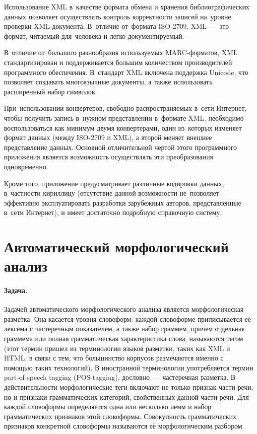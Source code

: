 \documentclass[12pt]{article}
\theoremstyle{definition}
\theoremstyle{remark}
\numberwithin{equation}{section}
\begin{document}
Использование XML в~качестве формата обмена и хранения библиографических
данных позволяет осуществлять контроль корректности записей
на~уровне проверки XML-документа. В~отличие от~формата ISO-2709,
XML~--- это формат, читаемый для~человека и легко документируемый.

В~отличие от~большого разнообразия используемых MARC-форматов, XML
стандартизирован и поддерживается большим количеством производителей
программного обеспечения. В~стандарт XML включена поддержка Unicode,
что позволяет создавать многоязычные документы, а также использовать
расширенный набор символов.

При~использовании конвертеров, свободно распространяемых в~сети
Интернет, чтобы получить запись в~нужном представлении в~формате XML,
необходимо воспользоваться как минимум двумя конвертерами, один из~которых
изменяет формат данных (между ISO-2709 и XML), а второй меняет внешнее
представление данных. Основной отличительной чертой этого программного
приложения является возможность осуществлять эти преобразования одновременно.

Кроме того, приложение предусматривает различные кодировки данных,
в~частности кириллицу (отсутствие данной возможности не~позволяет
эффективно эксплуатировать разработки зарубежных авторов, представленные
в~сети Интернет), и имеет достаточно подробную справочную систему.

\section{Автоматический морфологический анализ}

\paragraph{Задача.}
Задачей автоматического морфологического анализа является морфологическая разметка. Она касается уровня словоформ: каждой словоформе приписывается её лексема с частеречным показателем, а также набор граммем, причем отдельная граммема или полная грамматическая характеристика слова, называются тегом (этот термин пришел из терминологии языков разметки, таких как XML и HTML, в связи с тем, что большинство корпусов размечаются именно с помощью таких технологий). В иностранной терминологии употребляется термин part-of-speech tagging (POS-tagging), дословно~--- частеречная разметка. В действительности морфологические теги включают не только признак части речи, но и признаки грамматических категорий, свойственных данной части речи. Для каждой словоформы определяется одна или несколько лемм и набор грамматических признаков этой словоформы. Совокупность грамматических признаков конкретной словоформы называются её морфологическим разбором.
\end{document}
